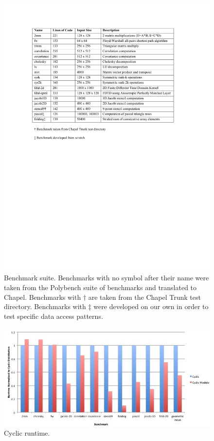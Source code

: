 \begin{figure}
	\begin{center}
	\includegraphics[scale=0.60]{./Figures/Benchmarks.pdf}
	\caption{Benchmark suite. Benchmarks with no symbol after their name were taken from the Polybench suite of benchmarks and translated to Chapel. Benchmarks with $\dagger$ are taken from the Chapel Trunk test directory. Benchmarks with $\ddagger$ were developed on our own in order to test specific data access patterns. }
	\label{benchmarks}
	\end{center}
\end{figure}

\begin{figure}
	\begin{center}
	\includegraphics[scale=0.30]{./Figures/cyclic_runtime}
	\caption{Cyclic runtime.}
	\label{cyclic_runtime}
	\end{center}
\end{figure}

